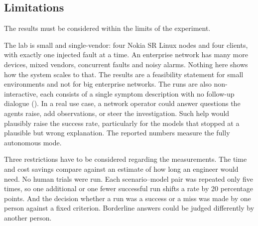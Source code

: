 \newpage
\subsection{Limitations}
\label{sec:limitations}

The results must be considered within the limits of the experiment.

The lab is small and single-vendor: four Nokia SR Linux nodes and four clients, with exactly
one injected fault at a time. An enterprise network has many more devices,
mixed vendors, concurrent faults and noisy alarms. Nothing here shows how the system scales
to that. The results are a feasibility statement for small environments and not for big enterprise networks.
The runs are also non-interactive, each consists of a single symptom
description with no follow-up dialogue (). In a real use case,
a network operator could answer questions the agents raise, add observations, or steer the
investigation. Such help would plausibly raise the success rate, particularly for the models
that stopped at a plausible but wrong explanation. The reported numbers measure the fully
autonomous mode.

Three restrictions have to be considered regarding the measurements. The time and cost savings compare against an estimate
of how long an engineer would need. No human trials were run. Each scenario--model pair was
repeated only five times, so one additional or one fewer successful run shifts a rate by 20 percentage points.
And the decision whether a run was a success or a miss was made by one person against a fixed criterion. Borderline answers
could be judged differently by another person.

